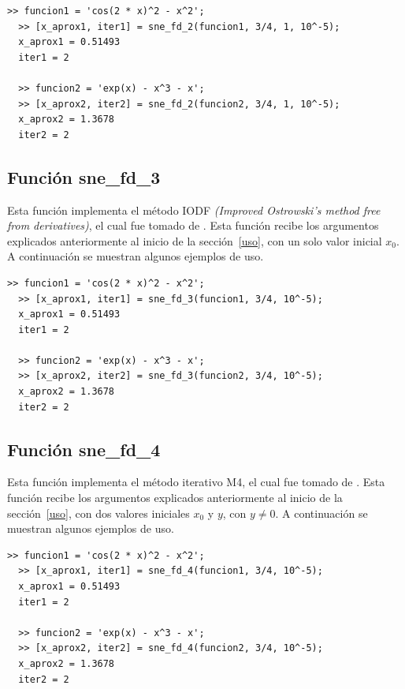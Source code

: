 \documentclass[12pt]{article}
\begin{document}
\begin{minipage}{\linewidth}
\begin{lstlisting}[frame = single]
  >> funcion1 = 'cos(2 * x)^2 - x^2';
  >> [x_aprox1, iter1] = sne_fd_2(funcion1, 3/4, 1, 10^-5);
  x_aprox1 = 0.51493
  iter1 = 2

  >> funcion2 = 'exp(x) - x^3 - x';
  >> [x_aprox2, iter2] = sne_fd_2(funcion2, 3/4, 1, 10^-5);
  x_aprox2 = 1.3678
  iter2 = 2

\end{lstlisting}
\end{minipage}

\subsection{Función sne\_fd\_3}
Esta función implementa el método IODF \textit{(Improved Ostrowski's method free from derivatives)}, el cual fue tomado de \cite{cordero2012steffensen}. Esta función recibe los argumentos explicados anteriormente al inicio de la sección~\ref{uso}, con un solo valor inicial $x_{0}$. A continuación se muestran algunos ejemplos de uso.

\begin{minipage}{\linewidth}
\begin{lstlisting}[frame = single]
  >> funcion1 = 'cos(2 * x)^2 - x^2';
  >> [x_aprox1, iter1] = sne_fd_3(funcion1, 3/4, 10^-5);
  x_aprox1 = 0.51493
  iter1 = 2

  >> funcion2 = 'exp(x) - x^3 - x';
  >> [x_aprox2, iter2] = sne_fd_3(funcion2, 3/4, 10^-5);
  x_aprox2 = 1.3678
  iter2 = 2
\end{lstlisting}
\end{minipage}

\subsection{Función sne\_fd\_4}
Esta función implementa el método iterativo M4, el cual fue tomado de \cite{bakhtiari2017widening}. Esta función recibe los argumentos explicados anteriormente al inicio de la sección~\ref{uso}, con dos valores iniciales $x_{0}$ y $y$, con $y \neq 0$. A continuación se muestran algunos ejemplos de uso.

\begin{minipage}{\linewidth}
\begin{lstlisting}[frame = single]
  >> funcion1 = 'cos(2 * x)^2 - x^2';
  >> [x_aprox1, iter1] = sne_fd_4(funcion1, 3/4, 10^-5);
  x_aprox1 = 0.51493
  iter1 = 2

  >> funcion2 = 'exp(x) - x^3 - x';
  >> [x_aprox2, iter2] = sne_fd_4(funcion2, 3/4, 10^-5);
  x_aprox2 = 1.3678
  iter2 = 2
\end{lstlisting}
\end{minipage}
\end{document}
